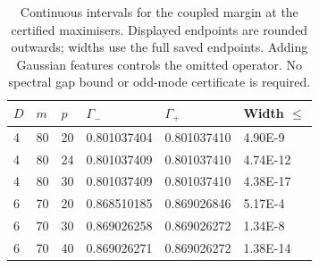 \begin{table}[htbp]
\centering
\caption{Continuous intervals for the coupled margin at the certified maximisers. Displayed endpoints are rounded outwards; widths use the full saved endpoints. Adding Gaussian features controls the omitted operator. No spectral gap bound or odd-mode certificate is required.}
\label{tab:coupled_refinement}
\begin{tabular}{llllll}
\toprule
$D$ & $m$ & $p$ & $\Gamma_- $ & $\Gamma_+$ & Width $\leq$ \\
\midrule
4 & 80 & 20 & 0.801037404 & 0.801037410 & 4.90E-9 \\
4 & 80 & 24 & 0.801037409 & 0.801037410 & 4.74E-12 \\
4 & 80 & 30 & 0.801037409 & 0.801037410 & 4.38E-17 \\
6 & 70 & 20 & 0.868510185 & 0.869026846 & 5.17E-4 \\
6 & 70 & 30 & 0.869026258 & 0.869026272 & 1.34E-8 \\
6 & 70 & 40 & 0.869026271 & 0.869026272 & 1.38E-14 \\
\bottomrule
\end{tabular}
\end{table}
